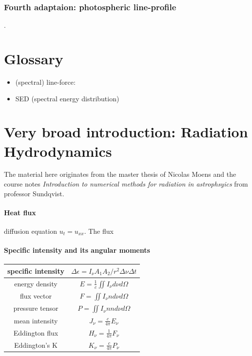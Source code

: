 \documentclass[../main/main.tex]{subfiles}
\begin{document}
\subsubsection{Fourth adaptaion: photospheric line-profile }
.

\newpage
\section{Glossary}
\begin{itemize}
\item (spectral) line-force: 

\item SED (spectral energy distribution)

\end{itemize}


\newpage
\section{Very broad introduction: Radiation Hydrodynamics}
The material here originates from the master thesis of Nicolas Moens and the course notes \textit{Introduction to numerical methods for radiation in astrophsyics} from professor Sundqvist. 

\paragraph{Heat flux}
diffusion equation $u_t = u_{xx}$. The flux  

\paragraph{Specific intensity and its angular moments}

\begin{center}
\centering
{\tabulinesep=1.5mm
\begin{tabu}{|c|c|}
\hline 
specific intensity & $\Delta \epsilon = \boxed{I_{\nu}} A_1 A_2/r^2 \Delta \nu \Delta t$ \\ \hline
energy density & $E = \frac{1}{c} \iint I_{\nu} d\nu d\Omega$ \\ \hline
flux vector & $F = \iint I_{\nu}n d\nu d\Omega$ \\ \hline
pressure tensor & $P = \iint I_{\nu} nn d\nu d\Omega$ \\ \hline
mean intensity & $J_{\nu} = \frac{c}{4 \pi} E_{\nu}$ \\ \hline
Eddington flux & $H_{\nu} = \frac{1}{4 \pi} F_{\nu}$ \\ \hline
Eddington's K & $K_{\nu} = \frac{c}{4 \pi}P_{\nu}$ \\ \hline
\end{tabu}}
\end{center}
\end{document}
